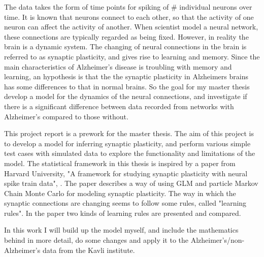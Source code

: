 The data takes the form of time points for spiking of # individual neurons over time. It is known that neurons connect to each other, so that the activity of one neuron can affect the activity of another. When scientist model a neural network, these connections are typically regarded as being fixed. However, in reality the brain is a dynamic system. The changing of neural connections in the brain is referred to as synaptic plasticity, and gives rise to learning and memory. Since the main  characteristics of Alzheimer's disease is troubling with memory and learning, an hypothesis is that the the synaptic plasticity in Alzheimers brains has some differences to that in normal brains. So the goal for my master thesis develop a model for the dynamics of the neural connections, and investigate if there is a significant difference between data recorded from networks with Alzheimer's compared to those without. 

This project report is a prework for the master thesis. The aim of this project is to develop a model for inferring synaptic plasticity, and perform various simple test cases with simulated data to explore the functionality and limitations of the model. The statistical framework in this thesis is inspired by a paper from Harvard University, "A framework for studying synaptic plasticity with neural spike train data", \cite{Linderman}. The paper describes a way of using GLM and particle Markov Chain Monte Carlo for modeling synaptic plasticity. The way in which the synaptic connections are changing seems to follow some rules, called "learning rules". In the paper two kinds of learning rules are presented and compared.

In this work I will build up the model myself, and include the mathematics behind in more detail, do some changes and apply it to the Alzheimer's/non-Alzheimer's data from the Kavli institute.